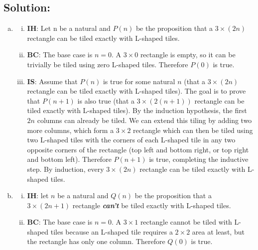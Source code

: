 \documentclass[12pt]{article}
\begin{document}
	\subsection*{\textbf{Solution:}}
	\begin{enumerate}[(a)]
		\item
			\begin{enumerate}[(i)]
				\item \textbf{IH}: Let n be a natural and $P(n)$ be the proposition that
					a $3\times(2n)$ rectangle can be tiled exactly with L-shaped tiles.

				\item \textbf{BC}: The base case is $n=0$. A $3\times 0$ rectangle is
					empty, so it can be trivially be tiled using zero L-shaped tiles.
					Therefore $P(0)$ is true.

				\item \textbf{IS}: Assume that $P(n)$ is true for some natural $n$ (that
					a $3\times(2n)$ rectangle can be tiled exactly with L-shaped tiles).
					The goal is to prove that $P(n+1)$ is also true (that a $3\times(2(n+1)
					)$ rectangle can be tiled exactly with L-shaped tiles). By the induction
					hypothesis, the first $2n$ columns can already be tiled. We can extend
					this tiling by adding two more columns, which form a $3\times2$
					rectangle which can then be tiled using two L-shaped tiles with the
					corners of each L-shaped tile in any two opposite corners of the
					rectangle (top left and bottom right, or top right and bottom left).
					Therefore $P(n+1)$ is true, completing the inductive step. By
					induction, every $3\times(2n)$ rectangle can be tiled exactly with L-shaped
					tiles.
			\end{enumerate}

		\item
			\begin{enumerate}[(i)]
				\item \textbf{IH}: let $n$ be a natural and $Q(n)$ be the proposition that
					a $3\times(2n+1)$ rectangle \textit{\textbf{can't}} be tiled exactly
					with L-shaped tiles.

				\item \textbf{BC}: The base case is $n=0$. A $3\times1$ rectangle cannot
					be tiled with L-shaped tiles because an L-shaped tile requires a
					$2\times2$ area at least, but the rectangle has only one column.
					Therefore $Q(0)$ is true.


\end{enumerate}
\end{enumerate}
\end{document}
